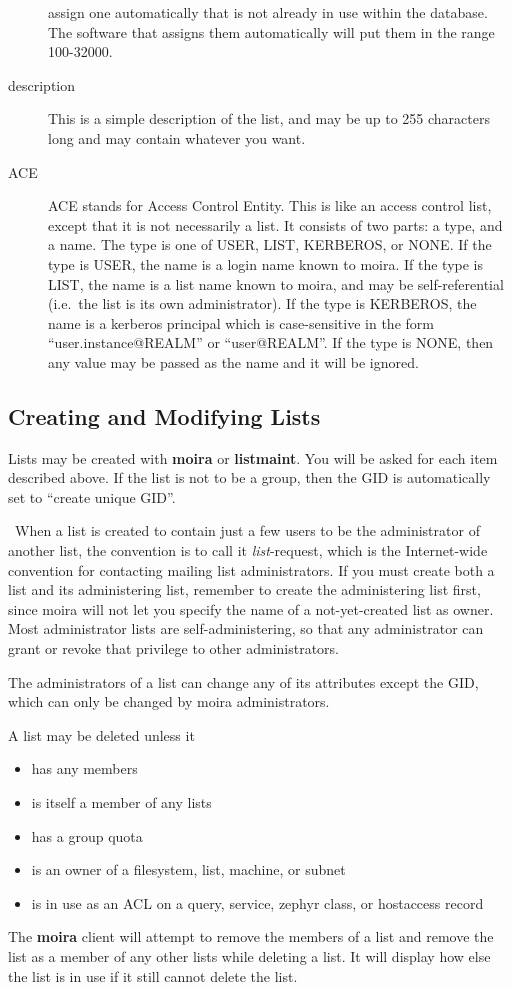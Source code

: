 \begin{description}
assign one automatically that is not already in use within the
database.  The software that assigns them automatically will put them
in the range 100-32000.
\item[description] This is a simple description of the list, and may be up
to 255 characters long and may contain whatever you want.
\item[ACE] ACE stands for Access Control Entity.  This is like an access
control list, except that it is not necessarily a list.  It consists
of two parts: a type, and a name.  The type is one of USER, LIST,
KERBEROS, or NONE.  If the type is USER, the name is a login name
known to moira.  If the type is LIST, the name is a list name known to
moira, and may be self-referential (i.e.\ the list is its own
administrator).   If the type is KERBEROS, the name is
a kerberos principal which is case-sensitive in the form
``user.instance@REALM'' or ``user@REALM''.  If the type is NONE,
then any value may be passed as the name and it will be ignored.
\end{description}

\subsection{Creating and Modifying Lists}

Lists may be created with {\bf moira} or {\bf listmaint}.  You will be
asked for each item described above.  If the list is not to be a
group, then the GID is automatically set to ``create unique GID''.

\athena\ When a list is created to contain just a few users to be the
administrator of another list, the convention is to call it
{\em list}-request, which is the Internet-wide convention for contacting
mailing list administrators.  If you must create both a list and its
administering list, remember to create the administering list first,
since moira will not let you specify the name of a not-yet-created
list as owner.  Most administrator lists are self-administering, so
that any administrator can grant or revoke that privilege to other
administrators. 

The administrators of a list can change any of its attributes except
the GID, which can only be changed by moira administrators.

A list may be deleted unless it
\begin{itemize}
\item has any members
\item is itself a member of any lists
\item has a group quota
\item is an owner of a filesystem, list, machine, or subnet
\item is in use as an ACL on a query, service, zephyr class, or
hostaccess record
\end{itemize}
The {\bf moira} client will attempt to remove the members of a list and
remove the list as a member of any other lists while deleting a list.
It will display how else the list is in use if it still cannot delete
the list.


